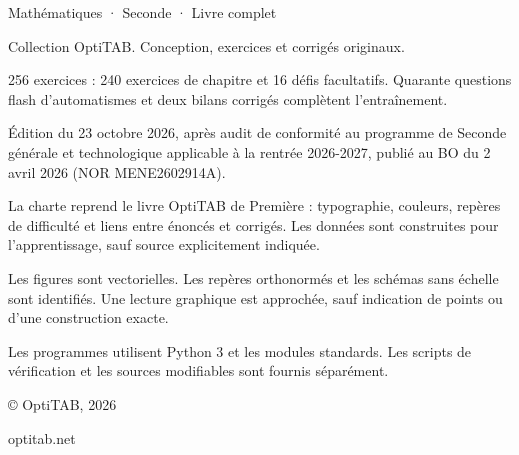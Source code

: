 \thispagestyle{empty}\vspace*{\fill}
{\otSemi\fontsize{10}{13}\selectfont Mathématiques · Seconde · Livre complet}\par\medskip
{\fontsize{9}{12}\selectfont\color{otMuted}
Collection OptiTAB. Conception, exercices et corrigés originaux.\par
256 exercices : 240 exercices de chapitre et 16 défis facultatifs. Quarante questions flash d’automatismes et deux bilans corrigés complètent l’entraînement.\par\medskip
Édition du 23 octobre 2026, après audit de conformité au programme de Seconde générale et technologique applicable à la rentrée 2026-2027, publié au BO du 2 avril 2026 (NOR MENE2602914A).\par\medskip
La charte reprend le livre OptiTAB de Première : typographie, couleurs, repères de difficulté et liens entre énoncés et corrigés. Les données sont construites pour l’apprentissage, sauf source explicitement indiquée.\par\medskip
Les figures sont vectorielles. Les repères orthonormés et les schémas sans échelle sont identifiés. Une lecture graphique est approchée, sauf indication de points ou d’une construction exacte.\par\medskip
Les programmes utilisent Python 3 et les modules standards. Les scripts de vérification et les sources modifiables sont fournis séparément.\par\medskip
© OptiTAB, 2026\par optitab.net}
\clearpage